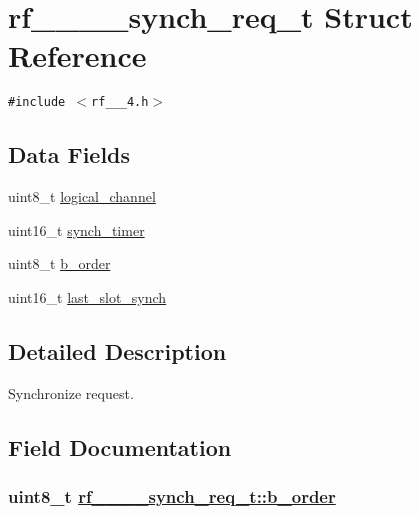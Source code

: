 \hypertarget{structrf__802__15__4__synch__req__t}{
\section{rf\_\_\_\_\-synch\_\-req\_\-t Struct Reference}
\label{structrf__802__15__4__synch__req__t}
}
{\tt \#include $<$rf\_\_\_\-4.h$>$}

\subsection*{Data Fields}
\begin{CompactItemize}
\item 
uint8\_\-t \hyperlink{structrf__802__15__4__synch__req__t_5cde0c85fe36632ff8267a2173e187cd}{logical\_\-channel}
\item 
uint16\_\-t \hyperlink{structrf__802__15__4__synch__req__t_cebd13aabb32a619c972e9edbf9b26f2}{synch\_\-timer}
\item 
uint8\_\-t \hyperlink{structrf__802__15__4__synch__req__t_a9ae4f231cda108988b95407c9053888}{b\_\-order}
\item 
uint16\_\-t \hyperlink{structrf__802__15__4__synch__req__t_82ae23950d975bb6d356beaf05bbab50}{last\_\-slot\_\-synch}
\end{CompactItemize}


\subsection{Detailed Description}
Synchronize request. 



\subsection{Field Documentation}
\hypertarget{structrf__802__15__4__synch__req__t_a9ae4f231cda108988b95407c9053888}{
\subsubsection[b\_\-order]{\setlength{\rightskip}{0pt plus 5cm}uint8\_\-t \hyperlink{structrf__802__15__4__synch__req__t_a9ae4f231cda108988b95407c9053888}{rf\_\_\_\_\-synch\_\-req\_\-t::b\_\-order}}}
\label{structrf__802__15__4__synch__req__t_a9ae4f231cda108988b95407c9053888}


